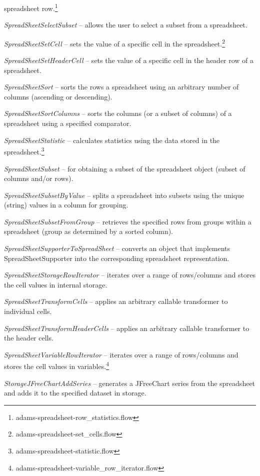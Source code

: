 \documentclass[a4paper]{book}
\begin{document}
\begin{tight_itemize}
	spreadsheet row.\footnote{adams-spreadsheet-row\_statistics.flow}
	\item \textit{SpreadSheetSelectSubset} -- allows the user to select a
	subset from a spreadsheet.
	\item \textit{SpreadSheetSetCell} -- sets the value of a specific cell
	in the spreadsheet.\footnote{adams-spreadsheet-set\_cells.flow}
	\item \textit{SpreadSheetSetHeaderCell} -- sets the value of a specific cell
	in the header row of a spreadsheet.
	\item \textit{SpreadSheetSort} -- sorts the rows a spreadsheet using an arbitrary
	number of columns (ascending or descending).
	\item \textit{SpreadSheetSortColumns} -- sorts the columns (or a subset of
	columns) of a spreadsheet using a specified comparator.
	\item \textit{SpreadSheetStatistic} -- calculates statistics using the
	data stored in the spreadsheet.\footnote{adams-spreadsheet-statistic.flow}
	\item \textit{SpreadSheetSubset} -- for obtaining a subset of the 
	spreadsheet object (subset of columns and/or rows).
	\item \textit{SpreadSheetSubsetByValue} -- splits a spreadsheet into 
	subsets using the unique (string) values in a column for grouping.
	\item \textit{SpreadSheetSubsetFromGroup} -- retrieves the specified
	rows from groups within a spreadsheet (group as determined by a sorted column).
	\item \textit{SpreadSheetSupporterToSpreadSheet} -- converts an object
	that implements SpreadSheetSupporter into the corresponding spreadsheet
	representation.
	\item \textit{SpreadSheetStorageRowIterator} -- iterates over a range of
	rows/columns and stores the cell values in internal storage.
	\item \textit{SpreadSheetTransformCells} -- applies an arbitrary callable
	transformer to individual cells.
	\item \textit{SpreadSheetTransformHeaderCells} -- applies an arbitrary callable
	transformer to the header cells.
	\item \textit{SpreadSheetVariableRowIterator} -- iterates over a range of 
	rows/columns and stores the cell values in 
	variables.\footnote{adams-spreadsheet-variable\_row\_iterator.flow}
	\item \textit{StorageJFreeChartAddSeries} -- generates a JFreeChart\cite{jfreechart}
	series from the spreadsheet and adds it to the specified dataset in storage.
\end{tight_itemize}
\end{document}
